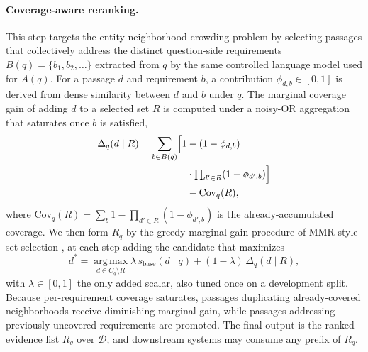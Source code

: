 \paragraph{Coverage-aware reranking.}
This step targets the entity-neighborhood crowding problem by
selecting passages that collectively address the distinct
question-side requirements $B(q)=\{b_1,b_2,\ldots\}$ extracted from
$q$ by the same controlled language model used for $A(q)$. For a
passage $d$ and requirement $b$, a contribution
$\phi_{d,b}\in[0,1]$ is derived from dense similarity between $d$
and $b$ under $q$. The marginal coverage gain of adding $d$ to a
selected set $R$ is computed under a noisy-OR aggregation that
saturates once $b$ is satisfied,
\begin{equation}
\label{eq:marginal-gain}
\begin{aligned}
\Delta_q(d \mid R)
=
\sum_{b \in B(q)}
\Bigl[
1
&{}-(1-\phi_{d,b})\\
&{}\cdot\textstyle\prod_{d'\in R}(1-\phi_{d',b})
\Bigr]\\
&{}- \mathrm{Cov}_q(R),
\end{aligned}
\end{equation}
where $\mathrm{Cov}_q(R)=\sum_b 1-\prod_{d'\in R}(1-\phi_{d',b})$ is the
already-accumulated coverage. We then form $R_q$ by the greedy
marginal-gain procedure of MMR-style set selection
\citep{carbonell1998mmr,lin2011submodular}, at each step adding the
candidate that maximizes
\begin{equation}
\label{eq:greedy-rerank}
d^{*}
=
\operatorname*{arg\,max}_{d \in C_q \setminus R}
\lambda\,s_{\mathrm{base}}(d \mid q)
+
(1-\lambda)\,\Delta_q(d \mid R),
\end{equation}
with $\lambda \in [0,1]$ the only added scalar, also tuned once on a
development split. Because per-requirement coverage saturates,
passages duplicating already-covered neighborhoods receive
diminishing marginal gain, while passages addressing previously
uncovered requirements are promoted. The final output is the ranked
evidence list $R_q$ over $\mathcal{D}$, and downstream systems may
consume any prefix of $R_q$.
